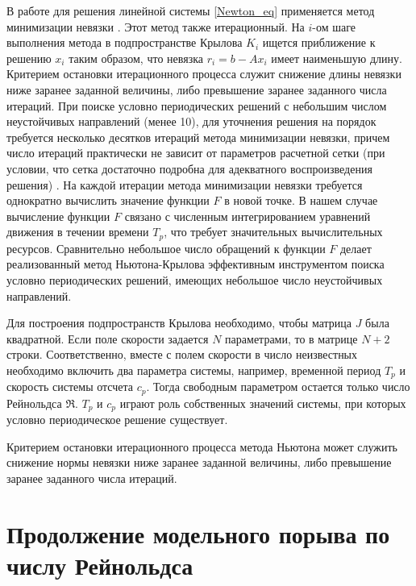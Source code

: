 В работе для решения линейной системы \eqref{Newton_eq} применяется метод минимизации невязки \cite{EEbook}. Этот метод также итерационный. На $i$-ом шаге выполнения метода в подпространстве Крылова $K_i$ ищется приближение к решению $x_i$ таким образом, что невязка $r_i = b - Ax_i$ имеет наименьшую длину. Критерием остановки итерационного процесса служит снижение длины невязки ниже заранее заданной величины, либо превышение заранее заданного числа итераций. При поиске условно периодических решений с небольшим числом неустойчивых направлений (менее 10), для уточнения решения на порядок требуется несколько десятков итераций метода минимизации невязки, причем число итераций  практически не зависит от параметров расчетной сетки (при условии, что сетка достаточно подробна для адекватного воспроизведения решения) \cite{Dijkstra2014}. На каждой итерации метода минимизации невязки требуется однократно вычислить значение функции $F$ в новой точке. В нашем случае вычисление функции $F$ связано с численным интегрированием уравнений движения в течении времени $T_p$, что требует значительных вычислительных ресурсов. Сравнительно небольшое число обращений к функции $F$ делает реализованный метод Ньютона-Крылова эффективным инструментом поиска условно периодических решений, имеющих небольшое число неустойчивых направлений.

Для построения подпространств Крылова необходимо, чтобы матрица $J$ была квадратной. Если поле скорости задается $N$ параметрами, то в матрице $N+2$ строки. Соответственно, вместе с полем скорости в число неизвестных необходимо включить два параметра системы, например, временной период $T_p$ и скорость системы отсчета $c_p$. Тогда свободным параметром остается только число Рейнольдса $\Re$. $T_p$ и $c_p$ играют роль собственных значений системы, при которых условно периодическое решение существует. 

Критерием остановки итерационного процесса метода Ньютона может служить снижение нормы невязки ниже заранее заданной величины, либо превышение заранее заданного числа итераций. 

\section{Продолжение модельного порыва по числу Рейнольдса} \label{contin_sec}

